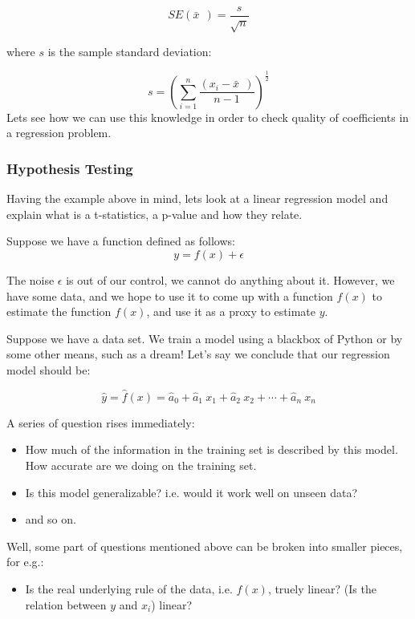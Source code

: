 \documentclass[11pt]{article}
\providecommand{\tightlist}{%
      \setlength{\itemsep}{0pt}\setlength{\parskip}{0pt}}
\begin{document}
\[ SE(\bar{x}\:\:) = \frac{s}{\sqrt{n}} \tag{2} \]

where $s$ is the sample standard deviation:

\[s = \left(\sum_{i=1}^n \frac{(x_i - \bar{x} \: \:)}{n-1}\right)^{\frac{1}{2}} \tag{3}\]
Lets see how we can use this knowledge in order to check quality of coefficients in a regression problem.

    \subsubsection{Hypothesis Testing}\label{hypothesis-testing}

    Having the example above in mind, lets look at a linear regression model
and explain what is a t-statistics, a p-value and how they relate.

    Suppose we have a function defined as follows:
\[ y = f(x) + \epsilon \tag{4} \]

The noise $\epsilon$ is out of our control, we cannot do anything
about it. However, we have some data, and we hope to use it to come up
with a function $\hat f(x)$ to estimate the function $f(x)$, and
use it as a proxy to estimate $y$.

Suppose we have a data set. We train a model using a blackbox of Python
or by some other means, such as a dream! Let's say we conclude that our
regression model should be:

\[ \hat y = \hat{f}(x) = \hat{a}_0 + \hat{a}_1\: x_1 + \hat{a}_2\: x_2 + \cdots + \hat{a}_n \: x_n \tag{5}\]

A series of question rises immediately:

\begin{itemize}
\tightlist
\item
  How much of the information in the training set is described by this
  model. How accurate are we doing on the training set.
\item
  Is this model generalizable? i.e. would it work well on unseen data?
\item
  and so on.
\end{itemize}

Well, some part of questions mentioned above can be broken into smaller
pieces, for e.g.:

\begin{itemize}
\tightlist
\item
  Is the real underlying rule of the data, i.e. $f(x)$, truely linear?
  (Is the relation between $y$ and $x_i$) linear?
\end{itemize}
\end{document}
